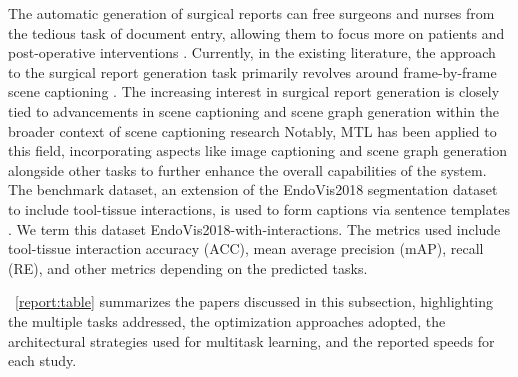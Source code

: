 \documentclass[times,twocolumn,final]{elsarticle}
\renewcommand{\cite}[1]{\citep{#1}}
\newcommand{\tabref}[1]{\tablename~\ref{#1}}
\begin{document}
The automatic generation of surgical reports can free surgeons and nurses from the tedious task of document entry, allowing them to focus more on patients and post-operative interventions \citep{xu2021class,lin2022sgt}. 
Currently, in the existing literature, the approach to the surgical report generation task primarily revolves around frame-by-frame scene captioning \citep{xu2021class,lin2022sgt,seenivasan2022global,mobarakol_task_aware}.
The increasing interest in surgical report generation is closely tied to advancements in scene captioning and scene graph generation within the broader context of scene captioning research \citep{9739429,Cornia_2020_CVPR}
Notably, MTL has been applied to this field, incorporating aspects like image captioning and scene graph generation alongside other tasks to further enhance the overall capabilities of the system. The benchmark dataset, an extension of the EndoVis2018 segmentation dataset to include tool-tissue interactions, is used to form captions via sentence templates \cite{islam2020learning}.  We term this dataset EndoVis2018-with-interactions. The metrics used include tool-tissue interaction accuracy (ACC), mean average precision (mAP), recall (RE), and other metrics depending on the predicted tasks.


\tabref{report:table} summarizes the papers discussed in this subsection, highlighting the multiple tasks addressed, the optimization approaches adopted, the architectural strategies used for multitask learning, and the reported speeds for each study.
\end{document}
